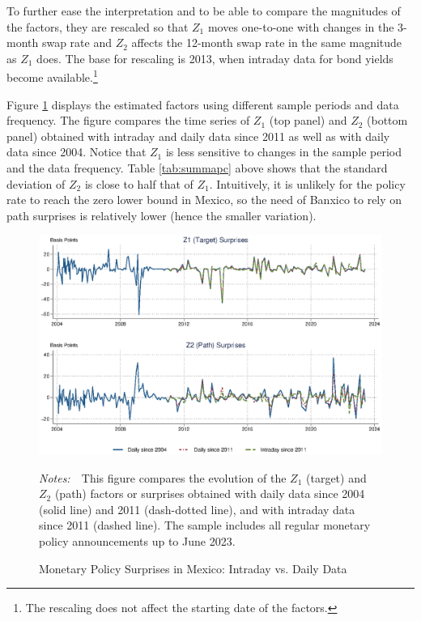 \documentclass[a4paper, 12pt]{article}
\newcommand{\figtext}[1]{
	\vspace{-1ex}
	\captionsetup{justification=justified,font=footnotesize}
	\caption*{#1}
}
\newcommand{\fignotes}[1]{\figtext{\emph{Notes:~}~#1}}
\providecommand{\lastobs}{June 2023}
\providecommand{\rotated}{Z}
\providecommand{\rtdone}{\rotated_{1}}
\providecommand{\rtdtwo}{\rotated_{2}}
\begin{document}
To further ease the interpretation and to be able to compare the magnitudes of the factors, they are rescaled so that \(\rtdone\) moves one-to-one with changes in the 3-month swap rate and \(\rtdtwo\) affects the 12-month swap rate in the same magnitude as \(\rtdone\) does. 
The base for rescaling is 2013, when intraday data for bond yields become available.\footnote{ The rescaling does not affect the starting date of the factors.} 

Figure \ref{fig:factorslines} displays the estimated factors using different sample periods and data frequency. 
The figure compares the time series of \(\rtdone\) (top panel) and \(\rtdtwo\) (bottom panel) obtained with intraday and daily data since 2011 as well as with daily data since 2004. 
Notice that \(\rtdone\) is less sensitive to changes in the sample period and the data frequency. 
Table \ref{tab:summapc} above shows that the standard deviation of \(\rtdtwo\) is close to half that of \(\rtdone\). 
Intuitively, it is unlikely for the policy rate to reach the zero lower bound in Mexico, so the need of Banxico to rely on path surprises is relatively lower (hence the smaller variation).

\begin{figure}[t]
	\caption{Monetary Policy Surprises in Mexico: Intraday vs. Daily Data} \label{fig:factorslines}
	\begin{center}								%
		\begin{minipage}{0.9\linewidth}
			\vspace{-0.4cm}
			\begin{center}
				\includegraphics[width=1\textwidth,height=.4\textheight]{../Figures/factorslines.eps} \\
			\end{center}
			\vspace{-0.4cm}
			\fignotes{This figure compares the evolution of the \( \rtdone \) (target) and \( \rtdtwo \) (path) factors or surprises obtained with daily data since 2004 (solid line) and 2011 (dash-dotted line), and with intraday data since 2011 (dashed line). The sample includes all regular monetary policy announcements up to \lastobs.}
		\end{minipage}
	\end{center}
\end{figure}
\end{document}
